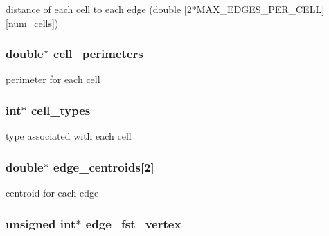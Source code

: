 distance of each cell to each edge (double \mbox{[}2$\ast$MAX\_\-EDGES\_\-PER\_\-CELL\mbox{]}\mbox{[}num\_\-cells\mbox{]}) 

\hypertarget{structFVL_1_1CFVMesh2D__cuda_a05366b974186ac70d633948b29c56384}{
\subsubsection[{cell\_\-perimeters}]{\setlength{\rightskip}{0pt plus 5cm}double$\ast$ {\bf cell\_\-perimeters}}}
\label{dd/d46/structFVL_1_1CFVMesh2D__cuda_a05366b974186ac70d633948b29c56384}


perimeter for each cell 

\hypertarget{structFVL_1_1CFVMesh2D__cuda_a294a0484d68f983a11a627a5df0a767a}{
\subsubsection[{cell\_\-types}]{\setlength{\rightskip}{0pt plus 5cm}int$\ast$ {\bf cell\_\-types}}}
\label{dd/d46/structFVL_1_1CFVMesh2D__cuda_a294a0484d68f983a11a627a5df0a767a}


type associated with each cell 

\hypertarget{structFVL_1_1CFVMesh2D__cuda_aff4d73402091e4860e902f3f7f66a06c}{
\subsubsection[{edge\_\-centroids}]{\setlength{\rightskip}{0pt plus 5cm}double$\ast$ {\bf edge\_\-centroids}\mbox{[}2\mbox{]}}}
\label{dd/d46/structFVL_1_1CFVMesh2D__cuda_aff4d73402091e4860e902f3f7f66a06c}


centroid for each edge 

\hypertarget{structFVL_1_1CFVMesh2D__cuda_a541be23cac3c920c96257391179a196c}{
\subsubsection[{edge\_\-fst\_\-vertex}]{\setlength{\rightskip}{0pt plus 5cm}unsigned int$\ast$ {\bf edge\_\-fst\_\-vertex}}}
\label{dd/d46/structFVL_1_1CFVMesh2D__cuda_a541be23cac3c920c96257391179a196c}



